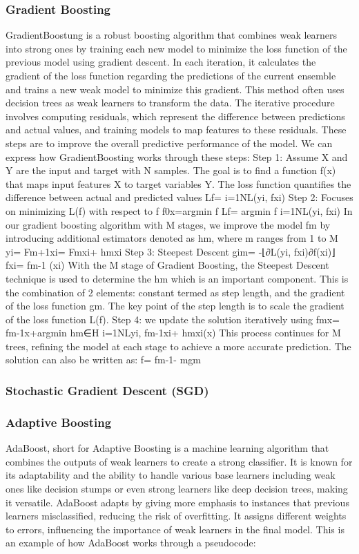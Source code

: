 \subsubsection{Gradient Boosting}
GradientBoostung is a robust boosting algorithm that combines weak learners into strong ones by training each new model to minimize the loss function of the previous model using gradient descent. In each iteration, it calculates the gradient of the loss function regarding the predictions of the current ensemble and trains a new weak model to minimize this gradient. This method often uses decision trees as weak learners to transform the data. The iterative procedure involves computing residuals, which represent the difference between predictions and actual values, and training models to map features to these residuals. These steps are to improve the overall predictive performance of the model. 
We can express how GradientBoosting works through these steps: 
Step 1: Assume X and Y are the input and target with N samples. The goal is to find a function f(x) that maps input features X to target variables Y. The loss function quantifies the difference between actual and predicted values
Lf= i=1NL(yi, fxi)
Step 2: Focuses on minimizing L(f) with respect to f
f0x=argmin f  Lf= argmin f  i=1NL(yi, fxi)
In our gradient boosting algorithm with M stages, we improve the model fm by introducing additional estimators denoted as hm, where m ranges from 1 to M
yi= Fm+1xi= Fmxi+ hmxi
Step 3: Steepest Descent
gim= -⌊∂L(yi, fxi)∂f(xi)⌋fxi= fm-1 (xi)
With the M stage of Gradient Boosting, the Steepest Descent technique is used to determine the  hm which is an important component. This is the combination of 2 elements: constant termed as step length, and the gradient of the loss function gm. The key point of the step length is to scale the gradient of the loss function L(f). 
Step 4: we update the solution iteratively using 
fmx= fm-1x+argmin hm∈H  i=1NLyi, fm-1xi+ hmxi(x)
This process continues for M trees, refining the model at each stage to achieve a more accurate prediction. The solution can also be written as:
f= fm-1- mgm

\subsubsection{Stochastic Gradient Descent (SGD)}


\subsubsection{Adaptive Boosting}
AdaBoost, short for Adaptive Boosting is a machine learning algorithm that combines the outputs of weak learners to create a strong classifier. It is known for its adaptability and the ability to handle various base learners including weak ones like decision stumps or even strong learners like deep decision trees, making it versatile. AdaBoost adapts by giving more emphasis to instances that previous learners misclassified, reducing the risk of overfitting. It assigns different weights to errors, influencing the importance of weak learners in the final model. 
This is an example of how AdaBoost works through a pseudocode: 

